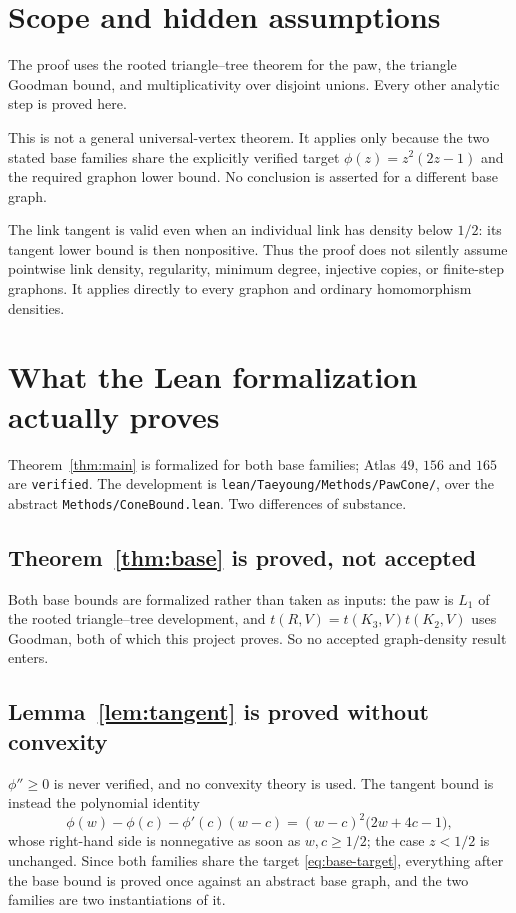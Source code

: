 \documentclass[11pt]{article}
\begin{document}
\section{Scope and hidden assumptions}

The proof uses the rooted triangle--tree theorem for the paw, the
triangle Goodman bound, and multiplicativity over disjoint unions.
Every other analytic step is proved here.

This is not a general universal-vertex theorem.  It applies only because
the two stated base families share the explicitly verified target
$\phi(z)=z^2(2z-1)$ and the required graphon lower bound.  No conclusion
is asserted for a different base graph.

The link tangent is valid even when an individual link has density below
$1/2$: its tangent lower bound is then nonpositive.  Thus the proof does
not silently assume pointwise link density, regularity, minimum degree,
injective copies, or finite-step graphons.  It applies directly to every
graphon and ordinary homomorphism densities.

\appendix
\section{What the Lean formalization actually proves}

Theorem~\ref{thm:main} is formalized for both base families; Atlas $49$, $156$
and $165$ are \texttt{verified}.  The development is
\texttt{lean/Taeyoung/Methods/PawCone/}, over the abstract
\texttt{Methods/ConeBound.lean}.  Two differences of substance.

\subsection*{Theorem~\ref{thm:base} is proved, not accepted}

Both base bounds are formalized rather than taken as inputs: the paw is $L_1$
of the rooted triangle--tree development, and $t(R,V)=t(K_3,V)t(K_2,V)$ uses
Goodman, both of which this project proves.  So no accepted graph-density
result enters.

\subsection*{Lemma~\ref{lem:tangent} is proved without convexity}

$\phi''\geq0$ is never verified, and no convexity theory is used.  The tangent
bound is instead the polynomial identity
\[
 \phi(w)-\phi(c)-\phi'(c)(w-c)=(w-c)^2\bigl(2w+4c-1\bigr),
\]
whose right-hand side is nonnegative as soon as $w,c\geq1/2$; the case
$z<1/2$ is unchanged.  Since both families share the target
\eqref{eq:base-target}, everything after the base bound is proved once against
an abstract base graph, and the two families are two instantiations of it.
\end{document}
